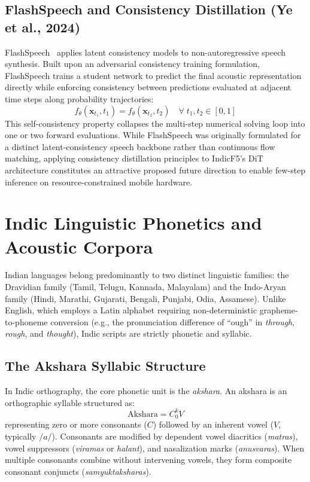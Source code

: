 \subsection{FlashSpeech and Consistency Distillation (Ye et al., 2024)}
FlashSpeech~\cite{flashspeech2024} applies latent consistency models to non-autoregressive speech synthesis. Built upon an adversarial consistency training formulation, FlashSpeech trains a student network to predict the final acoustic representation directly while enforcing consistency between predictions evaluated at adjacent time steps along probability trajectories:
\begin{equation}
    f_\theta(\mathbf{x}_{t_1}, t_1) = f_\theta(\mathbf{x}_{t_2}, t_2) \quad \forall \; t_1, t_2 \in [0, 1]
    \label{eq:consistency_property}
\end{equation}
This self-consistency property collapses the multi-step numerical solving loop into one or two forward evaluations. While FlashSpeech was originally formulated for a distinct latent-consistency speech backbone rather than continuous flow matching, applying consistency distillation principles to IndicF5's DiT architecture constitutes an attractive proposed future direction to enable few-step inference on resource-constrained mobile hardware.

\section{Indic Linguistic Phonetics and Acoustic Corpora}
Indian languages belong predominantly to two distinct linguistic families: the Dravidian family (Tamil, Telugu, Kannada, Malayalam) and the Indo-Aryan family (Hindi, Marathi, Gujarati, Bengali, Punjabi, Odia, Assamese). Unlike English, which employs a Latin alphabet requiring non-deterministic grapheme-to-phoneme conversion (e.g., the pronunciation difference of ``ough'' in \textit{through}, \textit{rough}, and \textit{thought}), Indic scripts are strictly phonetic and syllabic.

\subsection{The Akshara Syllabic Structure}
In Indic orthography, the core phonetic unit is the \textit{akshara}. An akshara is an orthographic syllable structured as:
\begin{equation}
    \text{Akshara} = C_0^k V
    \label{eq:akshara_structure}
\end{equation}
representing zero or more consonants ($C$) followed by an inherent vowel ($V$, typically $/a/$). Consonants are modified by dependent vowel diacritics (\textit{matras}), vowel suppressors (\textit{viramas} or \textit{halant}), and nasalization marks (\textit{anusvaras}). When multiple consonants combine without intervening vowels, they form composite consonant conjuncts (\textit{samyuktaksharas}).

